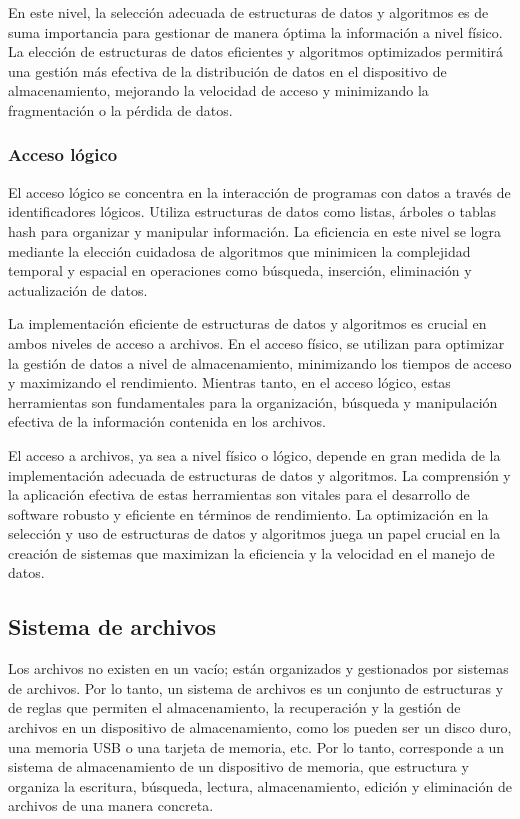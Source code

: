 \documentclass[11pt, twocolumn]{article}
\begin{document}
  En este nivel, la selección adecuada de estructuras de datos y algoritmos es de suma importancia para gestionar de manera óptima la información a nivel físico. La elección de estructuras de datos eficientes y algoritmos optimizados permitirá una gestión más efectiva de la distribución de datos en el dispositivo de almacenamiento, mejorando la velocidad de acceso y minimizando la fragmentación o la pérdida de datos.

  \subsubsection*{Acceso lógico}
  El acceso lógico se concentra en la interacción de programas con datos a través de identificadores lógicos. Utiliza estructuras de datos como listas, árboles o tablas hash para organizar y manipular información. La eficiencia en este nivel se logra mediante la elección cuidadosa de algoritmos que minimicen la complejidad temporal y espacial en operaciones como búsqueda, inserción, eliminación y actualización de datos.

  La implementación eficiente de estructuras de datos y algoritmos es crucial en ambos niveles de acceso a archivos. En el acceso físico, se utilizan para optimizar la gestión de datos a nivel de almacenamiento, minimizando los tiempos de acceso y maximizando el rendimiento. Mientras tanto, en el acceso lógico, estas herramientas son fundamentales para la organización, búsqueda y manipulación efectiva de la información contenida en los archivos.

  El acceso a archivos, ya sea a nivel físico o lógico, depende en gran medida de la implementación adecuada de estructuras de datos y algoritmos. La comprensión y la aplicación efectiva de estas herramientas son vitales para el desarrollo de software robusto y eficiente en términos de rendimiento. La optimización en la selección y uso de estructuras de datos y algoritmos juega un papel crucial en la creación de sistemas que maximizan la eficiencia y la velocidad en el manejo de datos.

  \subsection{Sistema de archivos}
  Los archivos no existen en un vacío; están organizados y gestionados por sistemas de archivos. Por lo tanto, un sistema de archivos es un conjunto de estructuras y de reglas que permiten el almacenamiento, la recuperación y la gestión de archivos en un dispositivo de almacenamiento, como los pueden ser un disco duro, una memoria USB o una tarjeta de memoria, etc. Por lo tanto, corresponde a un sistema de almacenamiento de un dispositivo de memoria, que estructura y organiza la escritura, búsqueda, lectura, almacenamiento, edición y eliminación de archivos de una manera concreta.
\end{document}
